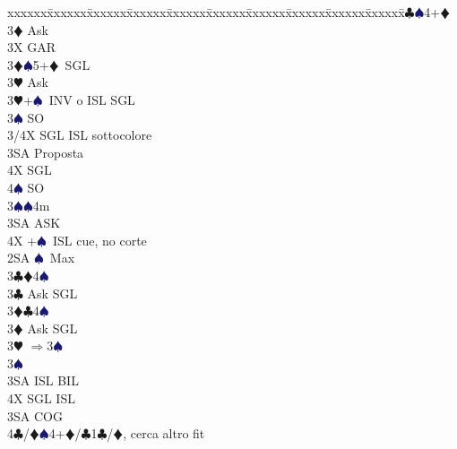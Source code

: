 \documentclass[a4paper,italian]{article}
\newcommand{\BC}{\textcolor{OliveGreen}{$\clubsuit$}}
\newcommand{\BD}{\textcolor{RedOrange}{$\vardiamondsuit$}}
\newcommand{\BH}{\textcolor{Red2}{$\varheartsuit${}}}
\newcommand{\BS}{\textcolor{MidnightBlue}{$\spadesuit${}}}
\newenvironment{bidtable}
{\begin{tabbing}

    xxxxxx\=xxxxxx\=xxxxxx\=xxxxxx\=xxxxxx\=xxxxxx\=xxxxxx\=xxxxxx\=xxxxxx\=xxxxxx\=\kill}
{\end{tabbing} }%
\begin{document}
\begin{multicols}{2}
\begin{bidtable}
                                            3\BC {}\BS 4+\BD \+\\
                                            3\BD \> Ask\+\\
                                            3X \> GAR\-\-\\
                                            3\BD {}\BS 5+\BD\ SGL\+\\
                                            3\BH \> Ask\-\\
                                            3\BH {}+\BS\ INV o ISL SGL\+\\
                                            3\BS \> SO\+\\
                                            3/4X \> SGL ISL sottocolore\-\\
                                            3SA \> Proposta\+\\
                                            4X \> SGL\\
                                            4\BS \> SO\-\-\\
                                            3\BS {}\BS 4m\+\\
                                            3SA \> ASK\-\\
                                            4X +\BS\ ISL cue, no corte\-\\
                                            2SA \BS\ Max\+\\
                                            3\BC {}\BD 4\BS \+\\
                                            3\BC \> Ask SGL\-\\
                                            3\BD {}\BC 4\BS \+\\
                                            3\BD \> Ask SGL\-\\
                                            3\BH \> $\Rightarrow$3\BS\+\\
                                            3\BS\+\\
                                            3SA \> ISL BIL\\
                                            4X \> SGL ISL\-\-\\
                                            3SA \> COG\\
                                            4\BC/\BD {}\BS4+\BD/\BC1\BC/\BD, cerca altro fit \-\\

\end{bidtable}
\end{multicols}
\end{document}
